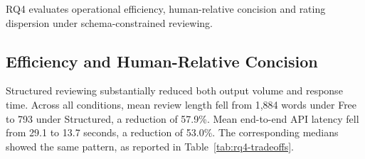 RQ4 evaluates operational efficiency, human-relative concision and rating dispersion under schema-constrained reviewing.

\subsection{Efficiency and Human-Relative Concision}
\label{sec:rq4-efficiency}

Structured reviewing substantially reduced both output volume and response time. Across all conditions, mean review length fell from 1,884 words under Free to 793 under Structured, a reduction of 57.9\%. Mean end-to-end API latency fell from 29.1 to 13.7 seconds, a reduction of 53.0\%. The corresponding medians showed the same pattern, as reported in Table~\ref{tab:rq4-tradeoffs}.

